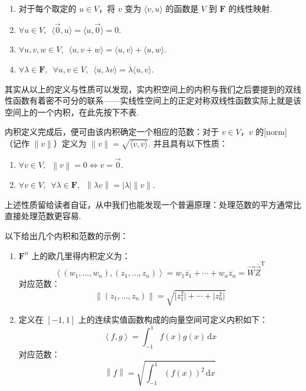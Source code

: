 \begin{enumerate}
    \item 对于每个取定的 $u \in V$，将 $ v $ 变为 $\langle v, u \rangle$ 的函数是 $ V $ 到 $\mathbf{F}$ 的线性映射.

    \item $\forall u \in V, \enspace \langle \vec{0}, u \rangle = \langle u, \vec{0} \rangle = 0$.

    \item $\forall u, v, w \in V, \enspace \langle u, v + w \rangle = \langle u, v \rangle + \langle u, w \rangle$.

    \item $\forall \lambda \in \mathbf{F}, \enspace \forall u, v \in V, \enspace \langle u, \lambda v \rangle = \overline{\lambda} \langle u, v \rangle$.
\end{enumerate}

其实从以上的定义与性质可以发现，实内积空间上的内积与我们之后要提到的双线性函数有着密不可分的联系——实线性空间上的正定对称双线性函数实际上就是该空间上的一个内积，在此先按下不表.

内积定义完成后，便可由该内积确定一个相应的范数：对于 $v \in V$，$v$ 的[norm]（记作 $ \lVert v \rVert $）定义为 $ \lVert v \rVert = \sqrt{\langle v, v \rangle}$. 并且具有以下性质：

\begin{enumerate}
    \item $\forall v \in V, \enspace \left\lVert v \right\rVert = 0 \iff v = \vec{0}$.

    \item $\forall v \in V, \enspace \forall \lambda \in \mathbf{F}, \enspace \left\lVert \lambda v \right\rVert  = \left\lvert \lambda \right\rvert \lVert v \rVert$.
\end{enumerate}

上述性质留给读者自证，从中我们也能发现一个普遍原理：处理范数的平方通常比直接处理范数更容易.

以下给出几个内积和范数的示例：

\begin{example} \label{ex:23:内积和范数}
    \begin{enumerate}
        \item $\mathbf{F}^{n}$ 上的欧几里得内积定义为：
              \[\left\langle (w_1, \ldots, w_n), (z_1, \ldots, z_n)\right\rangle = w_1\overline{z_1} + \cdots + w_n\overline{z_n} = \vec{W}\overline{\vec{Z}}^{\mathrm{T}}\]
              对应范数：
              \[\left\lVert (z_1, \ldots, z_n) \right\rVert  = \sqrt{\lvert z^2_1 \rvert + \cdots + \lvert z^2_n \rvert}\]

        \item \label{item:23:内积和范数:2}
              定义在 $ \left[-1, 1\right] $ 上的连续实值函数构成的向量空间可定义内积如下：
              \[\left\langle f, g\right\rangle = \int_{-1}^1f(x)g(x)\,\mathrm{d}x\]
              对应范数：
              \[\left\lVert f \right\rVert = \sqrt{\int_{-1}^1(f(x))^2\,\mathrm{d}x}\]
    \end{enumerate}
\end{example}

